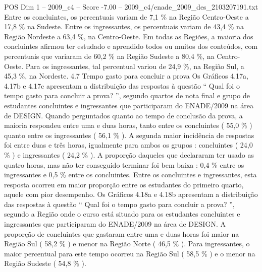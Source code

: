 \begin{textsample}{POS Dim 1 – 2009\_c4 – Score -7.00 – 2009\_c4/enade\_2009\_des\_2103207191.txt}
Entre os concluintes, os percentuais variam de 7,1 \% na Região Centro-Oeste a 17,8 \% na Sudeste.
Entre os ingressantes, os percentuais variam de 43,4 \% na Região Nordeste a 63,4 \%, na Centro-Oeste.
Em todas as Regiões, a maioria dos concluintes afirmou ter estudado e aprendido todos ou muitos dos conteúdos, com percentuais que variaram de 60,2 \% na Região Sudeste a 80,4 \%, na Centro-Oeste.
Para os ingressantes, tal percentual variou de 24,9 \%, na Região Sul, a 45,3 \%, na Nordeste. 4.7 Tempo gasto para concluir a prova Os Gráficos 4.17a, 4.17b e 4.17c apresentam a distribuição das respostas à questão “ Qual foi o tempo gasto para concluir a prova? ”, segundo quartos de nota final e grupo de estudantes concluintes e ingressantes que participaram do ENADE/2009 na área de DESIGN.
Quando perguntados quanto ao tempo de conclusão da prova, a maioria respondeu entre uma e duas horas, tanto entre os concluintes ( 55,0 \% ) quanto entre os ingressantes ( 56,1 \% ).
A segunda maior incidência de respostas foi entre duas e três horas, igualmente para ambos os grupos : concluintes ( 24,0 \% ) e ingressantes ( 24,2 \% ).
A proporção daqueles que declararam ter usado as quatro horas, mas não ter conseguido terminar foi bem baixa : 0,4 \% entre os ingressantes e 0,5 \% entre os concluintes.
Entre os concluintes e ingressantes, esta resposta ocorreu em maior proporção entre os estudantes do primeiro quarto, aquele com pior desempenho.
Os Gráficos 4.18a e 4.18b apresentam a distribuição das respostas à questão “ Qual foi o tempo gasto para concluir a prova? ”, segundo a Região onde o curso está situado para os estudantes concluintes e ingressantes que participaram do ENADE/2009 na área de DESIGN.
A proporção de concluintes que gastaram entre uma e duas horas foi maior na Região Sul ( 58,2 \% ) e menor na Região Norte ( 46,5 \% ).
Para ingressantes, o maior percentual para este tempo ocorreu na Região Sul ( 58,5 \% ) e o menor na Região Sudeste ( 54,8 \% ).

\end{textsample}
